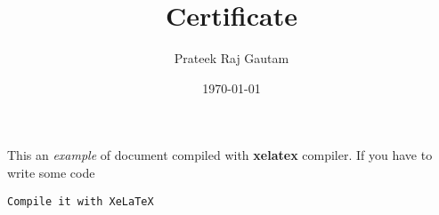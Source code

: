 \documentclass[12pt]{article}
\title{Certificate}
\author{Prateek Raj Gautam}
\date{\today}
\begin{document}
 
\maketitle
 
This an \textit{example} of document compiled with \textbf{xelatex} compiler. If you have to write some code

\begin{verbatim}
Compile it with XeLaTeX
\end{verbatim}
 
 
\end{document}
